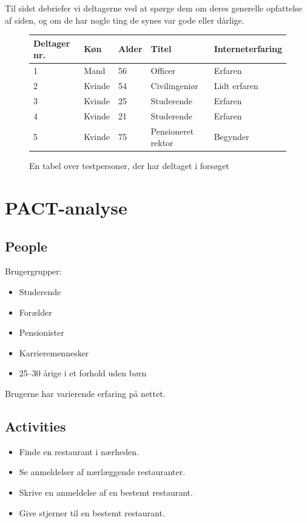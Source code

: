 \documentclass[a4paper, 12pt]{article}
\begin{document}
Til sidst debriefer vi deltagerne ved at spørge dem om deres generelle
opfattelse af siden, og om de har nogle ting de synes var gode eller dårlige.

\begin{figure}[htbp]
  \centering
  \begin{tabular}{ l l l l l }
    \textbf{Deltager nr.} & \textbf{Køn}   & \textbf{Alder} & \textbf{Titel} &
    \textbf{Interneterfaring} \\
    \midrule
    1            & Mand   & 56    & Officer             & Erfaren         \\
    2            & Kvinde & 54    & Civilingeniør       & Lidt erfaren    \\
    3            & Kvinde & 25    & Studerende          & Erfaren         \\
    4            & Kvinde & 21    & Studerende          & Erfaren         \\
    5            & Kvinde & 75    & Pensioneret rektor  & Begynder        \\
  \end{tabular}
  \caption{En tabel over testpersoner, der har deltaget i forsøget}
  \label{tab:testpersoner}
\end{figure}



\section{PACT-analyse}

\subsection{People}

Brugergrupper:
\begin{itemize}
\item Studerende
\item Forælder
\item Pensionister
\item Karrieremennesker
\item 25--30 årige i et forhold uden børn
\end{itemize}
Brugerne har varierende erfaring på nettet.

\subsection{Activities}

\begin{itemize}
\item Finde en restaurant i nærheden.
\item Se anmeldelser af nærlæggende restauranter.
\item Skrive en anmeldelse af en bestemt restaurant.
\item Give stjerner til en bestemt restaurant.
\end{itemize}
\end{document}
